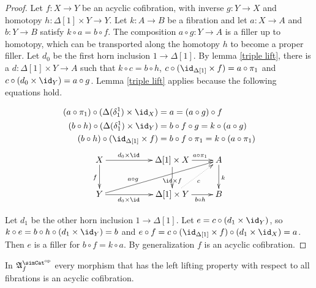 \documentclass{tac}
\newcommand\dual{^{\mathrm{op}}}
\newcommand\s{^{\simCat\dual}}
\newcommand\of{:}
\newcommand\simplex\Delta
\newcommand\f{_f}
\newcommand\ambient{\mathfrak A}
\begin{document}
\begin{proof} Let $f\of X\to Y$ be an acyclic cofibration, with inverse $g\of Y\to X$ and homotopy $h\of\simplex[1]\times Y\to Y$. Let $k\of A\to B$ be a fibration and let $a\of X\to A$ and $b\of Y\to B$ satisfy $k\circ a=b\circ f$. The composition $a\circ g\of Y\to A$ is a filler up to homotopy, which can be transported along the homotopy $h$ to become a proper filler. Let $d_0$ be the first horn inclusion $1\to \simplex[1]$. By lemma \ref{triple lift}, there is a $d\of \simplex[1]\times Y\to A$ such that $k\circ c=b\circ h$, $c\circ (\id_{\simplex[1]}\times f)= a\circ \pi_1$ and $c\circ (d_0\times \id_Y) = a\circ g$.
Lemma \ref{triple lift} applies because the following equations hold.

\begin{align*} 
	(a\circ \pi_1)\circ (\simplex(\delta^1_1)\times\id_X) &= a = (a\circ g)\circ f\\
	(b\circ h)\circ (\simplex(\delta^1_1)\times\id_Y) &= b\circ f\circ g = k\circ (a\circ g)\\
	(b\circ h)\circ (\id_{\simplex[1]}\times f) &= b\circ f\circ \pi_1 = k\circ (a\circ \pi_1)
\end{align*}
\[\xymatrix{
X\ar[d]_f \ar[rr]^(.4){d_0\times \id} && \simplex[1]\times X \ar[d]|(.6){\id\times f}\ar[r]^(.6){a\circ \pi_1} & A\ar[d]^k\\
Y \ar[rr]_(.4){d_0\times \id}\ar[urrr]^(.3){a\circ g} && \simplex[1]\times Y\ar[r]_(.6){b\circ h}\ar@{.>}[ur]_c & B
}\]

Let $d_1$ be the other horn inclusion $1\to \simplex[1]$. Let $e=c\circ(d_1\times \id_Y)$, so $k\circ e=b\circ h\circ (d_1\times \id_Y) = b$ and $e\circ f = c\circ (\id_{\simplex[1]}\times f)\circ (d_1\times \id_X) = a$. Then $e$ is a filler for $b\circ f=k\circ a$. By generalization $f$ is an acyclic cofibration.
\end{proof}

\begin{lemma} In $\ambient\s\f$ every morphism that has the left lifting property with respect to all fibrations is an acyclic cofibration. \label{lifting is acyclic} \end{lemma}
\end{document}
